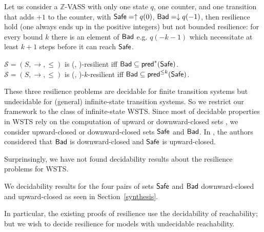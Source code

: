 \begin{example}
Let us consider a $\mathds{Z}$-VASS with only one state $q$, one counter, and one transition that adds $+1$ to the counter, with $\textsf{Safe} = \uparrow q(0)$, $\textsf{Bad} = \downarrow q(-1)$,
then resilience hold (one always ends up in the positive integers) but not bounded resilience: for every bound $k$ there is an element of $\textsf{Bad}$ e.g. $q(-k-1)$ which necessitate at least $k+1$ steps before it can reach $\textsf{Safe}$. 
\end{example}


\begin{remark}[Reformulation]\label{reformulation}
$\mathscr{S}=(S,\rightarrow,\leq)$ is %
(\Safe, \Bad)-resilient iff $\textsf{Bad} \subseteq \textsf{pred}^*(\textsf{Safe})$.\\
$\mathscr{S}=(S,\rightarrow,\leq)$ is %
(\Safe, \Bad)-$k$-resilient iff $\textsf{Bad} \subseteq \textsf{pred}^{\leq k}(\textsf{Safe})$.
\end{remark}

These three resilience problems are decidable for finite transition systems but undecidable for (general) infinite-state transition systems. So we restrict our framework to the class of infinite-state WSTS. Since most of decidable properties in WSTS rely on the computation of upward or downward-closed sets \cite{DBLP:journals/iandc/AbdullaCJT00, DBLP:journals/tcs/FinkelS01}, we consider upward-closed or downward-closed sets $\textsf{Safe}$ and $\textsf{Bad}$. In \cite{DBLP:journals/corr/abs-2108-00889}, the authors considered that $\textsf{Bad}$ is downward-closed and $\textsf{Safe}$ is upward-closed.

Surprinsingly, we have not found decidability results about the resilience problems for WSTS.

%		
We  
decidability results for the four pairs of sets $\textsf{Safe}$ and $\textsf{Bad}$ downward-closed and upward-closed as seen in Section~\ref{synthesis}.

In particular, the existing proofs of resilience use the decidability of reachability; but we wish to decide resilience for models with undecidable reachability.
%





\iffalse

